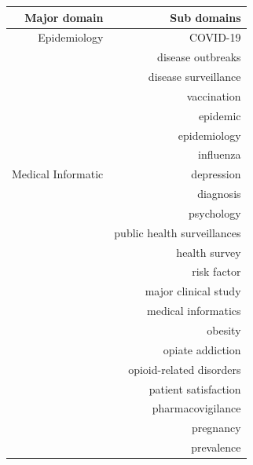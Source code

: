 \begin{center}
    \begin{longtable}{ rr }
        \hline
        Major domain          & Sub domains                     \\ [0.5ex]
        \hline
        Epidemiology          & COVID-19                        \\
                              & disease outbreaks               \\
                              & disease surveillance            \\
                              & vaccination                     \\
                              & epidemic                        \\
                              & epidemiology                    \\
                              & influenza                       \\
        \hline
        Medical Informatic    & depression                      \\
                              & diagnosis                       \\
                              & psychology                      \\
                              & public health surveillances     \\
                              & health survey                   \\
                              & risk factor                     \\
                              & major clinical study            \\
                              & medical informatics             \\
                              & obesity                         \\
                              & opiate addiction                \\
                              & opioid-related disorders        \\
                              & patient satisfaction            \\
                              & pharmacovigilance               \\
                              & pregnancy                       \\
                              & prevalence                      \\

\end{longtable}
\end{center}

